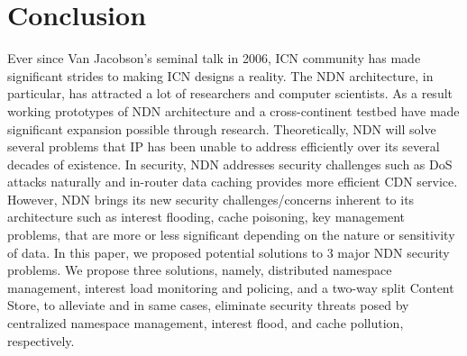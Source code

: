 \documentclass[conference,compsoc]{IEEEtran}
\begin{document}
\section{Conclusion}
\label{Conclusion}
Ever since Van Jacobson's seminal talk in 2006, ICN community has made significant strides to making ICN designs a reality. The NDN architecture, in particular, has attracted a lot of researchers and computer scientists. As a result working prototypes of NDN architecture and a cross-continent testbed have made significant expansion possible through research. Theoretically, NDN will solve several problems that IP has been unable to address efficiently over its several decades of existence. In security, NDN addresses security challenges such as DoS attacks naturally and in-router data caching provides more efficient CDN service. However, NDN brings its new security challenges/concerns inherent to its architecture such as interest flooding, cache poisoning, key management problems, that are more or less significant depending on the nature or sensitivity of data. In this paper, we proposed potential solutions to 3 major NDN security problems. We propose three solutions, namely, distributed namespace management, interest load monitoring and policing, and a two-way split Content Store, to alleviate and in same cases, eliminate security threats posed by centralized namespace management, interest flood, and cache pollution, respectively. 



%
%
%



%



\end{document}
